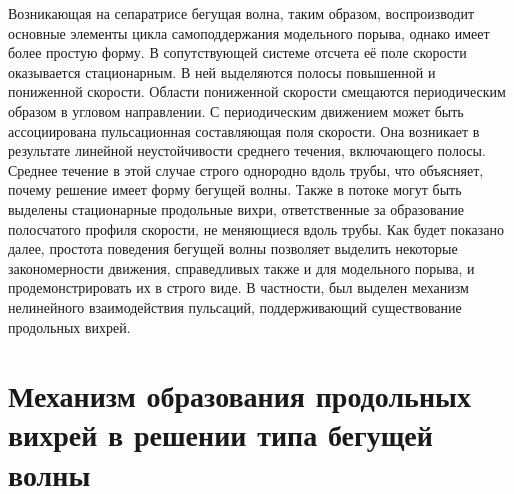 Возникающая на сепаратрисе бегущая волна, таким образом, воспроизводит основные элементы цикла самоподдержания модельного порыва, однако имеет более простую форму. В сопутствующей системе отсчета её поле скорости оказывается стационарным. В ней выделяются полосы повышенной и пониженной скорости. Области пониженной скорости смещаются периодическим образом в угловом направлении. С периодическим движением может быть ассоциирована пульсационная составляющая поля скорости. Она возникает в результате линейной неустойчивости среднего течения, включающего полосы. Среднее течение в этой случае строго однородно вдоль трубы, что объясняет, почему решение имеет форму бегущей волны. Также в потоке могут быть выделены стационарные продольные вихри, ответственные за образование полосчатого профиля скорости, не меняющиеся вдоль трубы. Как будет показано далее, простота поведения бегущей волны позволяет выделить некоторые закономерности движения, справедливых также и для модельного порыва, и продемонстрировать их в строго виде. В частности, был выделен механизм нелинейного взаимодействия пульсаций, поддерживающий существование продольных вихрей. 


\section{Механизм образования продольных вихрей в решении типа бегущей волны}

